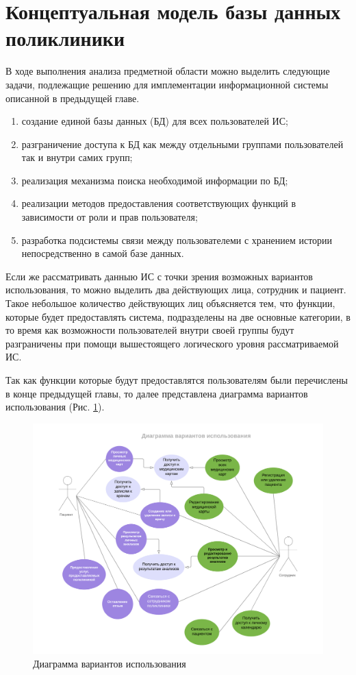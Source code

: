 \documentclass[14pt,a4paper,russian]{extreport}
\begin{document}
\section{Концептуальная модель базы данных поликлиники}
В ходе выполнения анализа предметной области можно выделить следующие задачи, подлежащие решению
для имплементации информационной системы описанной в предыдущей главе.
\begin{enumerate}[noitemsep]
    \item создание единой базы данных (БД) для всех пользователей ИС;
    \item разграничение доступа к БД как между отдельными группами пользователей так и внутри самих групп;
    \item реализация механизма поиска необходимой информации по БД;
    \item реализации методов предоставления соответствующих функций в зависимости от роли и прав
        пользователя;
    \item разработка подсистемы связи между пользователеми с хранением истории непосредственно в
        самой базе данных.
\end{enumerate}
Если же рассматривать данныю ИС с точки зрения возможных вариантов использования, то можно выделить
два действующих лица, сотрудник и пациент. Такое небольшое количество действующих лиц объясняется
тем, что функции, которые будет предоставлять система, подразделены на две основные категории, в то
время как возможности пользователей внутри своей группы будут разграничены при помощи вышестоящего
логического уровня рассматриваемой ИС.

Так как функции которые будут предоставлятся пользователям были перечислены в конце предыдущей
главы, то далее представлена диаграмма вариантов использования (Рис. \ref{fig:ClinicDB}).

\begin{figure}[h]
        \includegraphics[width=\textwidth]{ClinicDB}
        \caption{Диаграмма вариантов использования}
        \label{fig:ClinicDB}
\end{figure}
\end{document}
